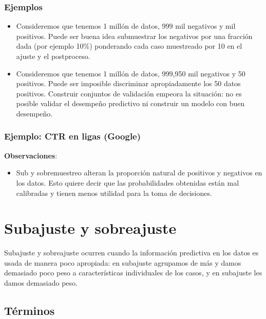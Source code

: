 \documentclass[
]{book}
\providecommand{\tightlist}{%
  \setlength{\itemsep}{0pt}\setlength{\parskip}{0pt}}
\begin{document}
\hypertarget{ejemplos-2}{%
\subsubsection*{Ejemplos}\label{ejemplos-2}}


\begin{itemize}
\item
  Consideremos que tenemos 1 millón de datos, 999 mil negativos y mil positivos. Puede ser buena idea submuestrar los negativos por una fracción dada (por ejemplo 10\%) ponderando cada caso muestreado por 10 en el ajuste y el postproceso.
\item
  Consideremos que tenemos 1 millón de datos, 999,950 mil negativos y 50 positivos. Puede ser imposible discriminar apropiadamente los 50 datos positivos. Construir conjuntos de validación empeora la situación: no es posible validar el desempeño predictivo ni construir un modelo con buen desempeño.
\end{itemize}

\hypertarget{ejemplo-ctr-en-ligas-google}{%
\subsubsection*{Ejemplo: CTR en ligas (Google)}\label{ejemplo-ctr-en-ligas-google}}


\textbf{Observaciones}:

\begin{itemize}
\tightlist
\item
  Sub y sobremuestreo alteran la proporción natural de positivos y negativos en los datos. Esto quiere decir que las probabilidades obtenidas están mal calibradas y tienen menos utilidad para la toma de decisiones.
\end{itemize}

\hypertarget{subajuste-y-sobreajuste}{%
\section{Subajuste y sobreajuste}\label{subajuste-y-sobreajuste}}

Subajuste y sobreajuste ocurren cuando la información predictiva en los datos es
usada de manera poco apropiada: en subajuste agrupamos de más y damos demasiado poco
peso a características individuales de los casos, y en subajuste les damos demasiado peso.

\hypertarget{tuxe9rminos-2}{%
\subsection*{Términos}\label{tuxe9rminos-2}}
\end{document}
